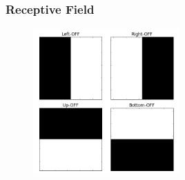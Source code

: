 \documentclass{beamer}
\begin{document}
\begin{frame}
 \frametitle{Receptive Field}

\begin{figure}
 \includegraphics[width = 0.5\textwidth]{figures/recRFs.png}
 \end{figure}

\end{frame}



%
%
%
%
%
%
%
%
\end{document}
